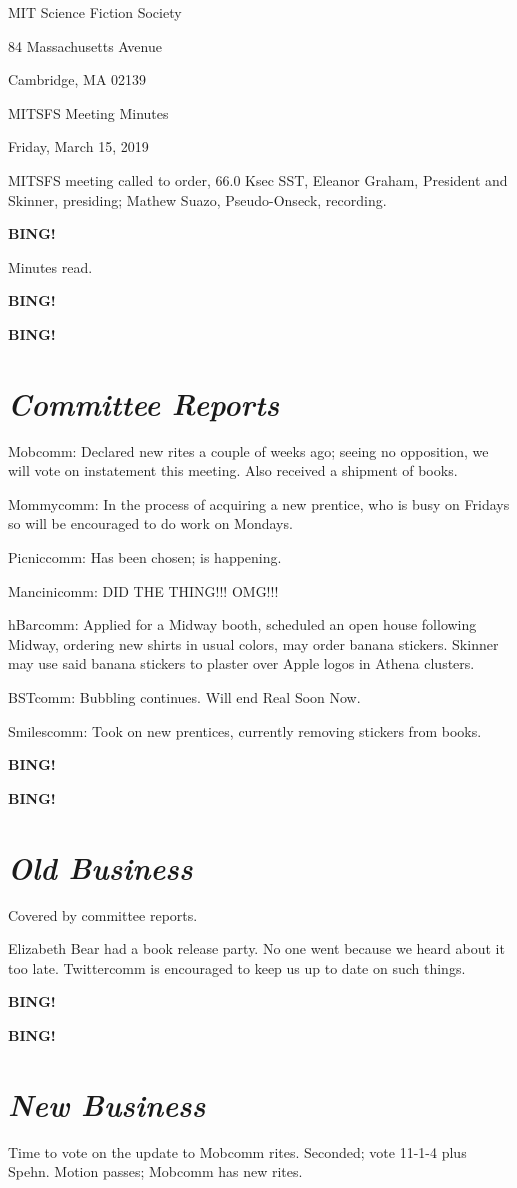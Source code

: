 \documentclass[10pt]{article}
\newcommand{\bing}{{\bf BING!} }
\newcommand{\goto}[1]{\bing \vskip 12pt \section*{{\em{#1}}}}
\newcommand{\ps}{ plus Spehn\xspace}
\newcommand{\skinner}{Eleanor Graham, President and Skinner}
\newcommand{\onseck}{Mathew Suazo, Pseudo-Onseck}
\newcommand{\meetingdate}{Friday, March 15, 2019 }
\begin{document}
\begin{center}

MIT Science Fiction Society

84 Massachusetts Avenue

Cambridge, MA 02139

\vspace{12pt}

MITSFS Meeting Minutes

\meetingdate

\end{center}

\vspace{18pt}

\setlength{\parskip}{6pt}

\noindent
MITSFS meeting called to order, 66.0 Ksec SST,
\skinner, presiding; \onseck, recording.

\bing

Minutes read.

\bing

\goto{Committee Reports}

Mobcomm: Declared new rites a couple of weeks ago; seeing no opposition, we will vote on instatement this meeting. Also received a shipment of books.

Mommycomm: In the process of acquiring a new prentice, who is busy on Fridays so will be encouraged to do work on Mondays.

Picniccomm: Has been chosen; is happening.

Mancinicomm: DID THE THING!!! OMG!!!

hBarcomm: Applied for a Midway booth, scheduled an open house following Midway, ordering new shirts in usual colors, may order banana stickers. Skinner may use said banana stickers to plaster over Apple logos in Athena clusters.

BSTcomm: Bubbling continues. Will end Real Soon Now.

Smilescomm: Took on new prentices, currently removing stickers from books.

\bing

\goto{Old Business}

Covered by committee reports.

Elizabeth Bear had a book release party. No one went because we heard about it too late. Twittercomm is encouraged to keep us up to date on such things.

\bing

\goto{New Business}

Time to vote on the update to Mobcomm rites. Seconded; vote 11-1-4 \ps. Motion passes; Mobcomm has new rites.
\end{document}
